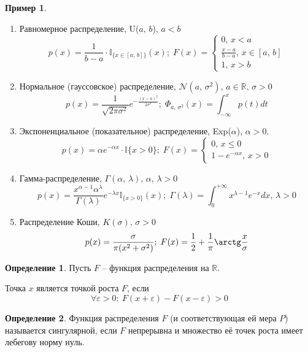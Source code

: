 \documentclass[a4paper,12pt]{article}
\renewcommand{\leq}{\ensuremath{\leqslant}}
\theoremstyle{plain}
\theoremstyle{definition}
\newtheorem{definition}{Определение}[section]
\newtheorem*{example}{Пример}
\theoremstyle{remark}
\begin{document}
\begin{example}
	\begin{enumerate}
		\item Равномерное распределение, U($a,\,b$), $a < b$
		      \[
			      p(x) = \frac{1}{b - a}\cdot\mathbb{I}_{\{x \in [a,\,b]\}}(x);\; F(x) = \begin{cases}
				      0,\, x < a                           \\
				      \frac{x - a}{b - a},\, x \in [a,\,b] \\
				      1,\, x > b
			      \end{cases}
		      \]
		\item Нормальное (гауссовское) распределение, $\mathcal{N}(a,\,\sigma^2),\, a \in \mathbb{R},\, \sigma > 0$
		      \[p(x) = \frac{1}{\sqrt{2\pi\sigma^2}}e^{-\frac{(x - a)^2}{2\sigma^2}};\; \Phi_{a,\,\sigma^2}(x) = \int_{-\infty}^x p(t)dt\]
		\item Экспоненциальное (показательное) распределение, Exp($\alpha$), $\alpha > 0$.
		      \[
			      p(x) = \alpha e^{-\alpha x}\cdot\mathbb{I}\{x > 0\};\; F(x) = \begin{cases}
				      0,\, x \leq 0 \\
				      1 - e^{-\alpha x},\, x > 0
			      \end{cases}
		      \]
		\item Гамма-распределение, $\Gamma(\alpha,\, \lambda),\, \alpha,\, \lambda > 0$
		      \[
			      p(x) = \frac{x^{\alpha - 1}\alpha^\lambda}{\Gamma(\lambda)}e^{-\lambda x}\mathbb{I}_{\{x > 0\}}(x);\; \Gamma(\lambda) = \int_0^{+\infty} x^{\lambda - 1}e^{-x}dx,\, \lambda > 0
		      \]
		\item Распределение Коши, $K(\sigma),\, \sigma > 0$
		      \[p(x) = \frac{\sigma}{\pi(x^2 + \sigma^2)};\; F(x) = \frac{1}{2} + \frac{1}{\pi}\arctg\frac{x}{\sigma}\]
	\end{enumerate}
\end{example}

\begin{definition}
	Пусть $F$ -- функция распределения на $\mathbb{R}$.

	Точка $x$ является точкой роста $F$, если
	\[\forall \varepsilon > 0 :\: F(x + \varepsilon) - F(x - \varepsilon) > 0\]
\end{definition}

\begin{definition}
	Функция распределения $F$ (и соответствующая ей мера $P$) называется сингулярной, если $F$ непрерывна и множество её точек роста имеет лебегову норму нуль.
\end{definition}
\end{document}
